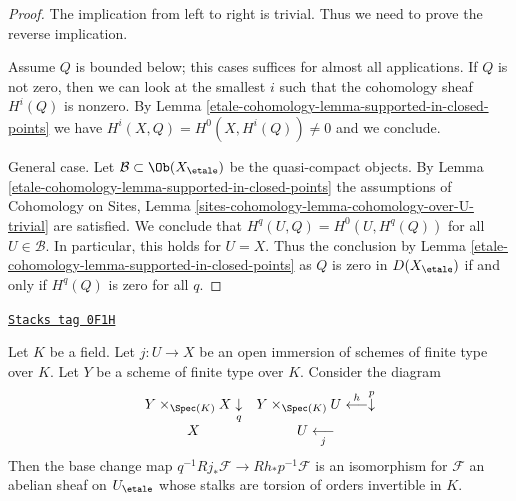\begin{proof}
The implication from left to right is trivial. Thus we need
to prove the reverse implication.

\medskip\noindent
Assume $Q$ is bounded below; this cases suffices for almost all
applications. If $Q$ is not zero, then we can look at the smallest $i$
such that the cohomology sheaf $H^i(Q)$ is nonzero.
By Lemma \ref{etale-cohomology-lemma-supported-in-closed-points} we have
$H^i(X, Q) = H^0(X, H^i(Q)) \not = 0$ and we conclude.

\medskip\noindent
General case. Let $\mathcal{B} \subset \Ob(X_\etale)$ be the
quasi-compact objects. By Lemma \ref{etale-cohomology-lemma-supported-in-closed-points}
the assumptions of Cohomology on Sites, Lemma
\ref{sites-cohomology-lemma-cohomology-over-U-trivial}
are satisfied. We conclude that $H^q(U, Q) = H^0(U, H^q(Q))$
for all $U \in \mathcal{B}$. In particular, this holds for $U = X$.
Thus the conclusion by Lemma \ref{etale-cohomology-lemma-supported-in-closed-points}
as $Q$ is zero in $D(X_\etale)$ if and only if $H^q(Q)$ is zero
for all $q$.
\end{proof}

\begin{lemma}
\label{etale-cohomology-lemma-kunneth-localize-on-X}
\href{https://stacks.math.columbia.edu/tag/0F1H}{\texttt{Stacks tag 0F1H}}

Let $K$ be a field. Let $j : U \to X$ be an open immersion of
schemes of finite type over $K$. Let $Y$ be a scheme of finite type
over $K$. Consider the diagram
$$
\begin{array}{cc}Y \times_{\Spec(K)} X \underset{q}{\downarrow} & Y \times_{\Spec(K)} U \overset{h}{\longleftarrow}\overset{p}{\downarrow} \\ X & U \underset{j}{\longleftarrow}\end{array}
$$
Then the base change map $q^{-1}Rj_*\mathcal{F} \to Rh_*p^{-1}\mathcal{F}$
is an isomorphism for $\mathcal{F}$ an abelian sheaf on $U_\etale$
whose stalks are torsion of orders invertible in $K$.
\end{lemma}

